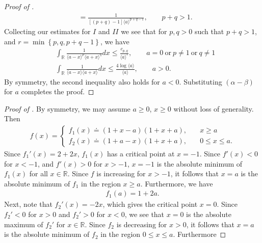 \documentclass[12pt,reqno]{amsart}
\numberwithin{equation}{section}  %
\renewcommand{\cref}{\Cref}
\newcommand{\rr}{\mathbb{R}}
\begin{document}
\begin{appendices}
\begin{proof}[Proof of \cref{lem:calc}]
\begin{equation*}
\begin{split}
  & = \frac{1}{[(p + q)-1] \langle a \rangle ^{p+q -1}}, \qquad p + q > 1.
\end{split}
\end{equation*}
%
%
Collecting our estimates for $I$ and $II$ we see that for 
$p, q > 0$ such that $p +q >1$, and $r =\min\left\{p, q, p+q-1
 \right\}$, we have 
%
\begin{align*}
  & \int_{\rr} \frac{1}{\langle a - x \rangle ^{p} \langle a + x \rangle
  ^{q}} d x
  \le \frac{c_{p,q}}{\langle a \rangle ^{r}}, \qquad a = 0 \ \text{or} \
  p \neq 1 \ \text{or} \ q \neq 1
  \\
  & \int_{\rr} \frac{1}{\langle a - x \rangle  \langle a + x \rangle
} d x
  \le  \frac{4 \log \langle a \rangle}{\langle a \rangle}, \qquad a > 0.
  \label{est-2}
\end{align*}
By symmetry, the second inequality also holds for $a < 0$. Substituting $(\alpha -
\beta)$ for $a$ completes the proof.
\end{proof}
%
%
\begin{proof}[Proof of \cref{lem:calc-lower-bound}]
By symmetry, we may assume $ a \ge 0$, $x \ge 0$ without loss of generality.
Then
%
%
\begin{equation*}
\begin{split}
f(x) = 
\begin{cases}
  f_{1}(x) \doteq (1 + x-a)(1 + x + a), \quad & x \ge a \\
  f_{2}(x) \doteq (1 + a -x)(1 + x + a), \quad & 0 \le x \le a.
\end{cases}
\end{split}
\end{equation*}
%
%
Since $f_{1}'(x) = 2 + 2x$, $f_{1}(x)$ has a critical point at $x=-1$. Since
$f'(x) < 0$ for $x <-1$, and $f'(x) > 0$ for $x > -1$, $x=-1$ is the absolute
minimum of $f_{1}(x)$ for all $x \in \rr$. Since $f$ is increasing for $x > -1$,
it follows that $x=a$ is the absolute minimum of $f_{1}$ in the region $x \ge
a$. Furthermore, we have
%
%
\begin{equation*}
\begin{split}
  f_{1}(a) = 1 + 2 a.
\end{split}
\end{equation*}
%
%
Next, note that $f_{2}'(x) = -2x$, which gives the critical point $x = 0$. Since
$f_{2}' < 0$ for $x>0$ and $f_{2}' > 0$ for $x < 0$, we see that $x=0$ is
the absolute maximum of $f_{2}'$ for  $x \in \rr$. Since $f_{2}$ is decreasing
for $x > 0$, it follows that $x = a$
is the absolute minimum of $f_{2}$ in the region $0 \le x \le a$. Furthermore

\end{proof}
\end{appendices}
\end{document}
